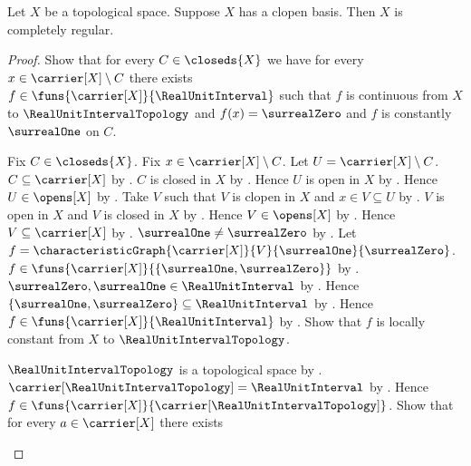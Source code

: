 \begin{theorem}\label{clopen_basis_implies_completely_regular}
    Let $X$ be a topological space.
    Suppose $X$ has a clopen basis.
    Then $X$ is completely regular.
\end{theorem}
\begin{proof}
    Show that for every $C\in\closeds{X}$ we have for every
        $x\in\carrier[X]\setminus C$
        there exists $f\in\funs{\carrier[X]}{\RealUnitInterval}$ such that
            $f$ is continuous from $X$ to $\RealUnitIntervalTopology$ and
            $f(x)=\surrealZero$ and
            $f$ is constantly $\surrealOne$ on $C$.
    \begin{subproof}
        Fix $C\in\closeds{X}$.
        Fix $x\in\carrier[X]\setminus C$.
        Let $U=\carrier[X]\setminus C$.
        $C\subseteq\carrier[X]$ by .
        $C$ is closed in $X$ by .
        Hence $U$ is open in $X$ by .
        Hence $U\in\opens[X]$ by .
        Take $V$ such that $V$ is clopen in $X$ and $x\in V\subseteq U$
            by .
        $V$ is open in $X$ and $V$ is closed in $X$
            by .
        Hence $V\in\opens[X]$ by .
        Hence $V\subseteq\carrier[X]$ by .
        $\surrealOne\neq\surrealZero$
            by .
        Let $f=\characteristicGraph{\carrier[X]}{V}
            {\surrealOne}{\surrealZero}$.
        $f\in\funs{\carrier[X]}{\{\surrealOne,\surrealZero\}}$
            by .
        $\surrealZero,\surrealOne\in\RealUnitInterval$ by
            .
        Hence $\{\surrealOne,\surrealZero\}\subseteq\RealUnitInterval$
            by .
        Hence $f\in\funs{\carrier[X]}{\RealUnitInterval}$
            by .
        Show that $f$ is locally constant from $X$ to
            $\RealUnitIntervalTopology$.
        \begin{subproof}
            $\RealUnitIntervalTopology$ is a topological space
                by .
            $\carrier[\RealUnitIntervalTopology]=\RealUnitInterval$
                by .
            Hence $f\in\funs{\carrier[X]}
                {\carrier[\RealUnitIntervalTopology]}$.
            Show that for every $a\in\carrier[X]$ there exists

\end{subproof}
\end{subproof}
\end{proof}
